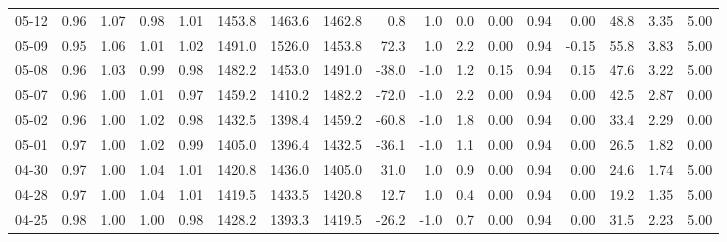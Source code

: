 \begin{threeparttable}
{\begin{tabular}{lrrrrrrrrrrrrrrrr}
  05-12 &         0.96 &           1.07 &          0.98 &          1.01 & 1453.8 & 1463.6 & 1462.8 &        0.8 &                      1.0 &                 0.0 &       0.00 &      0.94 &           0.00 &             48.8 &            3.35 &                   5.00 \\
  05-09 &         0.95 &           1.06 &          1.01 &          1.02 & 1491.0 & 1526.0 & 1453.8 &       72.3 &                      1.0 &                 2.2 &       0.00 &      0.94 &          -0.15 &             55.8 &            3.83 &                   5.00 \\
  05-08 &         0.96 &           1.03 &          0.99 &          0.98 & 1482.2 & 1453.0 & 1491.0 &      -38.0 &                     -1.0 &                 1.2 &       0.15 &      0.94 &           0.15 &             47.6 &            3.22 &                   5.00 \\
  05-07 &         0.96 &           1.00 &          1.01 &          0.97 & 1459.2 & 1410.2 & 1482.2 &      -72.0 &                     -1.0 &                 2.2 &       0.00 &      0.94 &           0.00 &             42.5 &            2.87 &                   0.00 \\
  05-02 &         0.96 &           1.00 &          1.02 &          0.98 & 1432.5 & 1398.4 & 1459.2 &      -60.8 &                     -1.0 &                 1.8 &       0.00 &      0.94 &           0.00 &             33.4 &            2.29 &                   0.00 \\
  05-01 &         0.97 &           1.00 &          1.02 &          0.99 & 1405.0 & 1396.4 & 1432.5 &      -36.1 &                     -1.0 &                 1.1 &       0.00 &      0.94 &           0.00 &             26.5 &            1.82 &                   0.00 \\
  04-30 &         0.97 &           1.00 &          1.04 &          1.01 & 1420.8 & 1436.0 & 1405.0 &       31.0 &                      1.0 &                 0.9 &       0.00 &      0.94 &           0.00 &             24.6 &            1.74 &                   5.00 \\
  04-28 &         0.97 &           1.00 &          1.04 &          1.01 & 1419.5 & 1433.5 & 1420.8 &       12.7 &                      1.0 &                 0.4 &       0.00 &      0.94 &           0.00 &             19.2 &            1.35 &                   5.00 \\
  04-25 &         0.98 &           1.00 &          1.00 &          0.98 & 1428.2 & 1393.3 & 1419.5 &      -26.2 &                     -1.0 &                 0.7 &       0.00 &      0.94 &           0.00 &             31.5 &            2.23 &                   5.00 \\

\end{tabular}}
\end{threeparttable}
